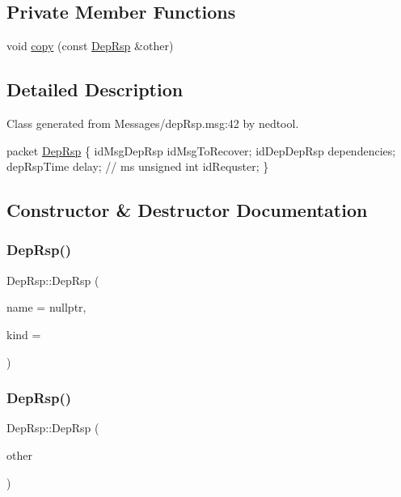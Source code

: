 \subsection*{Private Member Functions}
\begin{DoxyCompactItemize}
\item 
void \hyperlink{class_dep_rsp_ad8bf8a80dd4586392e1f5179b7b612f5}{copy} (const \hyperlink{class_dep_rsp}{Dep\+Rsp} \&other)
\end{DoxyCompactItemize}


\subsection{Detailed Description}
Class generated from {\ttfamily Messages/dep\+Rsp.\+msg\+:42} by nedtool. 


\begin{DoxyPre}
packet \hyperlink{class_dep_rsp}{DepRsp}
\{
    idMsgDepRsp idMsgToRecover;
    idDepDepRsp dependencies;
    depRspTime delay; // ms 
    unsigned int idRequster;
\}
\end{DoxyPre}
 

\subsection{Constructor \& Destructor Documentation}
\mbox{\label{class_dep_rsp_a86d6896d681e4467ec52c660738893ed}} 
\subsubsection{\texorpdfstring{Dep\+Rsp()}{DepRsp()}\hspace{0.1cm}{\footnotesize\ttfamily [1/2]}}
{\footnotesize\ttfamily Dep\+Rsp\+::\+Dep\+Rsp (\begin{DoxyParamCaption}\item[{const char $\ast$}]{name = {\ttfamily nullptr},  }\item[{short}]{kind = {} }\end{DoxyParamCaption})}

\mbox{\label{class_dep_rsp_a3b5894b34b151dced8080a6e5757c2a2}} 
\subsubsection{\texorpdfstring{Dep\+Rsp()}{DepRsp()}\hspace{0.1cm}{\footnotesize\ttfamily [2/2]}}
{\footnotesize\ttfamily Dep\+Rsp\+::\+Dep\+Rsp (\begin{DoxyParamCaption}\item[{const \hyperlink{class_dep_rsp}{Dep\+Rsp} \&}]{other }\end{DoxyParamCaption})}

